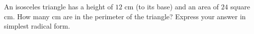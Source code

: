 An isosceles triangle has a height of $12$ cm (to its base) and an area of $24$ square cm. How many cm are in the perimeter of the triangle? Express your answer in simplest radical form.
